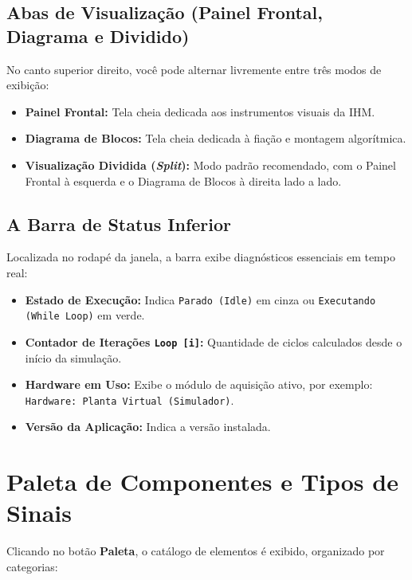 \documentclass[11pt,a4paper]{article}
\begin{document}
\subsection{Abas de Visualização (Painel Frontal, Diagrama e Dividido)}
No canto superior direito, você pode alternar livremente entre três modos de exibição:
\begin{itemize}
    \item \textbf{Painel Frontal:} Tela cheia dedicada aos instrumentos visuais da IHM.
    \item \textbf{Diagrama de Blocos:} Tela cheia dedicada à fiação e montagem algorítmica.
    \item \textbf{Visualização Dividida (\textit{Split}):} Modo padrão recomendado, com o Painel Frontal à esquerda e o Diagrama de Blocos à direita lado a lado.
\end{itemize}

\subsection{A Barra de Status Inferior}
Localizada no rodapé da janela, a barra exibe diagnósticos essenciais em tempo real:
\begin{itemize}
    \item \textbf{Estado de Execução:} Indica \texttt{Parado (Idle)} em cinza ou \texttt{Executando (While Loop)} em verde.
    \item \textbf{Contador de Iterações \texttt{Loop [i]}:} Quantidade de ciclos calculados desde o início da simulação.
    \item \textbf{Hardware em Uso:} Exibe o módulo de aquisição ativo, por exemplo: \texttt{Hardware: Planta Virtual (Simulador)}.
    \item \textbf{Versão da Aplicação:} Indica a versão instalada.
\end{itemize}

\section{Paleta de Componentes e Tipos de Sinais}

Clicando no botão \textbf{Paleta}, o catálogo de elementos é exibido, organizado por categorias:
\end{document}
